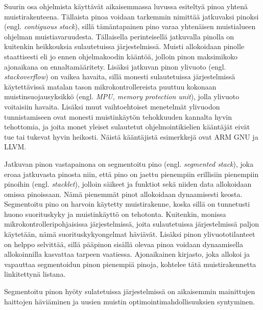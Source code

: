 Suurin osa ohjelmista käyttävät aikaisemmassa luvussa esiteltyä pinoa yhtenä muistirakenteena. Tällaista pinoa voidaan tarkemmin nimittää jatkuvaksi pinoksi (engl. \textit{contiguous stack}), sillä tämäntapainen pino varaa yhtenäisen muistialueen ohjelman muistiavaruudesta. Tällaisella perinteisellä jatkuvalla pinolla on kuitenkin heikkouksia sulautetuissa järjestelmissä. Muisti allokoidaan pinolle staattisesti eli jo ennen ohjelmakoodin kääntöä, jolloin pinon maksimikoko ajonaikana on ennaltamääritety. Lisäksi jatkuvan pinon ylivuoto (engl. \textit{stackoverflow}) on vaikea havaita, sillä monesti sulautetuissa järjestelmissä käytettävissä matalan tason mikrokontrollereista puuttuu kokonaan muistinsuojausyksikkö (engl. \textit{MPU, memory protection unit}), jolla ylivuoto voitaisiin havaita. Lisäksi muut vaihtoehtoiset menetelmät ylivuodon tunnistamiseen ovat monesti muistinkäytön tehokkuuden kannalta hyvin tehottomia, ja joita monet yleiset sulautetut ohjelmointikielien kääntäjät eivät tue tai tukevat hyvin heikosti. Näistä kääntäjistä esimerkkejä ovat ARM GNU ja LLVM.\cite{bsstes@2023}

Jatkuvan pinon vastapainona on segmentoitu pino (engl. \textit{segmented stack}), joka eroaa jatkuvasta pinosta niin, että pino on jaettu pienempiin erillisiin pienempiin pinoihin (engl. \textit{stacklet}), jolloin säikeet ja funktiot sekä niiden data allokoidaan omissa pinoissaan. Nämä pienemmät pinot allokoidaan dynaamisesti keosta. Segmentoitu pino on harvoin käytetty muistirakenne, koska sillä on tunnetusti huono suorituskyky ja muistinkäyttö on tehotonta. Kuitenkin, monissa mikrokontrolleripohjaisissa järjestelmissä, joita sulautetuissa järjestelmissä paljon käytetään, nämä suorituskykyongelmat häviävät. Lisäksi pinon ylivuototilanteet on helppo selvittää, sillä pääpinon sisällä olevaa pinoa voidaan dynaamisella allokoinnilla kasvattaa tarpeen vaatiessa. Ajonaikainen kirjasto, joka allokoi ja vapauttaa segmentoidun pinon pienempiä pinoja, kohtelee tätä muistirakennetta linkitettynä listana.\cite{bsstes@2023}


Segmentoitu pinon hyöty sulatetuissa järjestelmissä on aikaisemmin mainittujen haittojen häviäminen ja uusien muistin optimointimahdollisuuksien syntyminen.

~\\

